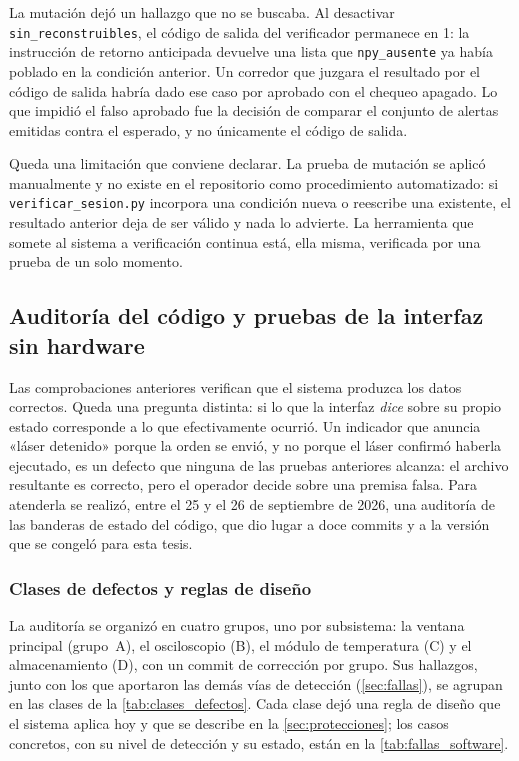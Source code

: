 La mutación dejó un hallazgo que no se buscaba. Al desactivar
\texttt{sin\_\allowbreak{}reconstruibles}, el código de salida del verificador
permanece en 1: la instrucción de retorno anticipada devuelve una lista
que \texttt{npy\_ausente} ya había poblado en la condición anterior. Un
corredor que juzgara el resultado por el código de salida habría dado
ese caso por aprobado con el chequeo apagado. Lo que impidió el falso
aprobado fue la decisión de comparar el conjunto de alertas emitidas
contra el esperado, y no únicamente el código de salida. 

Queda una limitación que conviene declarar. La prueba de mutación se
aplicó manualmente y no existe en el repositorio como procedimiento
automatizado: si \texttt{verificar\_\allowbreak{}sesion.py} incorpora una condición
nueva o reescribe una existente, el resultado anterior deja de ser
válido y nada lo advierte. La herramienta que somete al sistema a
verificación continua está, ella misma, verificada por una prueba de
un solo momento.

\subsection{Auditoría del código y pruebas de la interfaz sin hardware}
\label{sec:val_auditoria}

Las comprobaciones anteriores verifican que el sistema produzca los
datos correctos. Queda una pregunta distinta: si lo que la interfaz
\emph{dice} sobre su propio estado corresponde a lo que efectivamente
ocurrió. Un indicador que anuncia «láser detenido» porque la orden se
envió, y no porque el láser confirmó haberla ejecutado, es un defecto
que ninguna de las pruebas anteriores alcanza: el archivo resultante
es correcto, pero el operador decide sobre una premisa falsa. Para
atenderla se realizó, entre el 25 y el 26 de septiembre de 2026, una
auditoría de las banderas de estado del código, que dio lugar a doce
commits y a la versión que se
congeló para esta tesis.

\subsubsection*{Clases de defectos y reglas de diseño}

La auditoría se organizó en cuatro grupos, uno por subsistema: la
ventana principal (grupo~A), el osciloscopio (B), el módulo de
temperatura (C) y el almacenamiento (D), con un commit de corrección
por grupo. Sus hallazgos, junto con los que aportaron las demás vías
de detección (\cref{sec:fallas}), se agrupan en las clases de la
\cref{tab:clases_defectos}. Cada clase dejó una regla de diseño que el
sistema aplica hoy y que se describe en la \cref{sec:protecciones}; los
casos concretos, con su nivel de detección y su estado, están en la
\cref{tab:fallas_software}.

